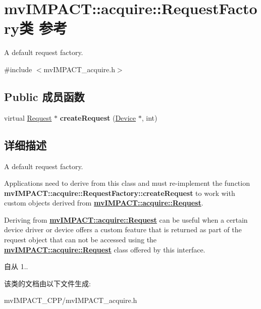 \hypertarget{classmv_i_m_p_a_c_t_1_1acquire_1_1_request_factory}{\section{mv\+I\+M\+P\+A\+C\+T\+:\+:acquire\+:\+:Request\+Factory类 参考}
\label{classmv_i_m_p_a_c_t_1_1acquire_1_1_request_factory}
}


A default request factory.  




{\ttfamily \#include $<$mv\+I\+M\+P\+A\+C\+T\+\_\+acquire.\+h$>$}

\subsection*{Public 成员函数}
\begin{DoxyCompactItemize}
\item 
\hypertarget{classmv_i_m_p_a_c_t_1_1acquire_1_1_request_factory_a28f798247b8b77d81a28369f2d550fee}{virtual \hyperlink{classmv_i_m_p_a_c_t_1_1acquire_1_1_request}{Request} $\ast$ {\bfseries create\+Request} (\hyperlink{classmv_i_m_p_a_c_t_1_1acquire_1_1_device}{Device} $\ast$, int)}\label{classmv_i_m_p_a_c_t_1_1acquire_1_1_request_factory_a28f798247b8b77d81a28369f2d550fee}

\end{DoxyCompactItemize}


\subsection{详细描述}
A default request factory. 

Applications need to derive from this class and must re-\/implement the function {\bfseries mv\+I\+M\+P\+A\+C\+T\+::acquire\+::\+Request\+Factory\+::create\+Request} to work with custom objects derived from {\bfseries \hyperlink{classmv_i_m_p_a_c_t_1_1acquire_1_1_request}{mv\+I\+M\+P\+A\+C\+T\+::acquire\+::\+Request}}.

Deriving from {\bfseries \hyperlink{classmv_i_m_p_a_c_t_1_1acquire_1_1_request}{mv\+I\+M\+P\+A\+C\+T\+::acquire\+::\+Request}} can be useful when a certain device driver or device offers a custom feature that is returned as part of the request object that can not be accessed using the {\bfseries \hyperlink{classmv_i_m_p_a_c_t_1_1acquire_1_1_request}{mv\+I\+M\+P\+A\+C\+T\+::acquire\+::\+Request}} class offered by this interface.

\begin{DoxySince}{自从}
1.. 
\end{DoxySince}


该类的文档由以下文件生成\+:\begin{DoxyCompactItemize}
\item 
mv\+I\+M\+P\+A\+C\+T\+\_\+\+C\+P\+P/mv\+I\+M\+P\+A\+C\+T\+\_\+acquire.\+h\end{DoxyCompactItemize}
